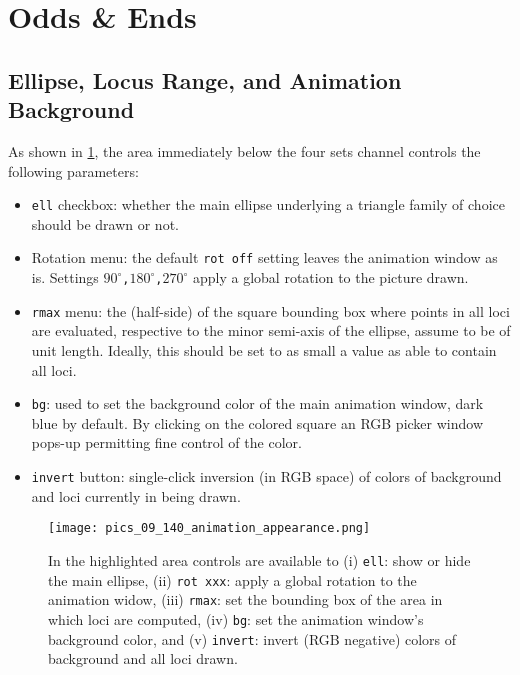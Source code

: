 \section{Odds \& Ends}

\subsection{Ellipse, Locus Range, and Animation Background} 

As shown in  \cref{fig:09-ellipse-range}, the area immediately below the four sets channel controls the following parameters:

\begin{itemize}
    \item \texttt{ell} checkbox: whether the main ellipse underlying a triangle family of choice should be drawn or not.
    \item Rotation menu: the default \texttt{rot off} setting leaves the animation window as is. Settings  \texttt{$90^\circ$,$180^\circ$,$270^\circ$} apply a global rotation to the picture drawn.
    \item \texttt{rmax} menu: the (half-side) of the square bounding box where points in all loci are evaluated, respective to the minor semi-axis of the ellipse, assume to be of unit length. Ideally, this should be set to as small a value as able to contain all loci. 
    \item \texttt{bg}: used to set the background color of the main animation window, dark blue by default. By clicking on the colored square an RGB picker window pops-up permitting fine control of the color.
    \item \texttt{invert} button: single-click inversion (in RGB space) of colors of background and loci currently in being drawn.
\end{itemize}

\begin{figure}
    \centering
    \texttt{[image: pics\_09\_140\_animation\_appearance.png]}
    \caption{In the highlighted area controls are available to (i) \texttt{ell}: show or hide the main ellipse, (ii) \texttt{rot xxx}: apply a global rotation to the animation widow, (iii) \texttt{rmax}: set the bounding box of the area in which loci are computed, (iv) \texttt{bg}: set the animation window's background color, and (v) \texttt{invert}: invert (RGB negative) colors of background and all loci drawn.}
    \label{fig:09-ellipse-range}
\end{figure}

